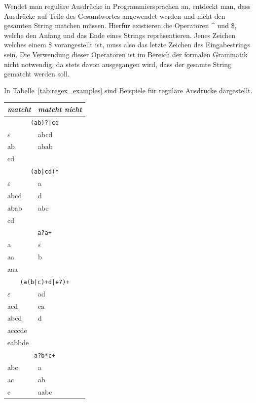 Wendet man reguläre Ausdrücke in Programmiersprachen an, entdeckt man, dass Ausdrücke auf Teile des Gesamtwortes angewendet werden und nicht den gesamten String matchen müssen. Hierfür existieren die Operatoren \^{} und \$, welche den Anfang und das Ende eines Strings repräsentieren. Jenes Zeichen welches einem \$ vorangestellt ist, muss also das letzte Zeichen des Eingabestrings sein. Die Verwendung dieser Operatoren ist im Bereich der formalen Grammatik nicht notwendig, da stets davon ausgegangen wird, dass der gesamte String gematcht werden soll.

In Tabelle~\ref{tab:regex_examples} sind Beispiele für reguläre Ausdrücke dargestellt.
%
\begin{table}[p]
 \begin{center}
  \begin{tabular}{ll}
    \hline \hline
      \emph{matcht} & \emph{matcht nicht} \\
    \hline \hline
      \multicolumn{2}{c}{\texttt{(ab)?|cd}} \\
    \hline
      $\varepsilon$ & abcd \\
      ab & abab \\
      cd & \\
    \hline
      \multicolumn{2}{c}{\texttt{(ab|cd)*}} \\
    \hline
      $\varepsilon$ & a \\
      abcd & d \\
      abab & abc \\
      cd & \\
    \hline
      \multicolumn{2}{c}{\texttt{a?a+}} \\
    \hline
      a & $\varepsilon$ \\
      aa & b \\
      aaa & \\
    \hline
      \multicolumn{2}{c}{\texttt{(a(b|c)+d|e?)+}} \\
    \hline
      $\varepsilon$ & ad \\
      acd & ea \\
      abcd & d \\
      acccde & \\
      eabbde & \\
    \hline
      \multicolumn{2}{c}{\texttt{a?b*c+}} \\
    \hline
      abc & a \\
      ac & ab \\
      c & aabc \\

\end{tabular}
\end{center}
\end{table}
